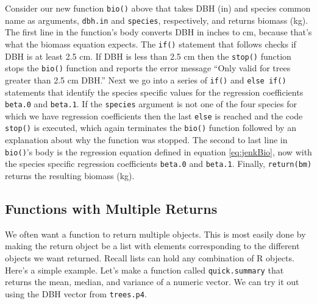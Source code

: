 \documentclass[]{krantz}
\makeatletter
\newenvironment{Shaded}{\begin{snugshade}}{\end{snugshade}}
\newcommand{\KeywordTok}[1]{\textcolor[rgb]{0.27,0.27,0.27}{\textbf{#1}}}
\newcommand{\DataTypeTok}[1]{\textcolor[rgb]{0.27,0.27,0.27}{#1}}
\newcommand{\StringTok}[1]{\textcolor[rgb]{0.5,0.5,0.5}{#1}}
\newcommand{\ControlFlowTok}[1]{\textcolor[rgb]{0.27,0.27,0.27}{\textbf{#1}}}
\newcommand{\OperatorTok}[1]{\textcolor[rgb]{0.43,0.43,0.43}{\textbf{#1}}}
\newcommand{\ErrorTok}[1]{\textcolor[rgb]{0.14,0.14,0.14}{\textbf{#1}}}
\newcommand{\NormalTok}[1]{#1}
\newenvironment{kframe}{%
\medskip{}
\setlength{\fboxsep}{.8em}
 \def\at@end@of@kframe{}%
 \ifinner\ifhmode%
  \def\at@end@of@kframe{\end{minipage}}%
  \begin{minipage}{\columnwidth}%
 \fi\fi%
 \def\FrameCommand##1{\hskip\@totalleftmargin \hskip-\fboxsep
 \colorbox{shadecolor}{##1}\hskip-\fboxsep
     \hskip-\linewidth \hskip-\@totalleftmargin \hskip\columnwidth}%
 \MakeFramed {\advance\hsize-\width
   \@totalleftmargin\z@ \linewidth\hsize
   \@setminipage}}%
 {\par\unskip\endMakeFramed%
 \at@end@of@kframe}
\renewenvironment{Shaded}{\begin{kframe}}{\end{kframe}}
\theoremstyle{definition}
\theoremstyle{definition}
\theoremstyle{definition}
\theoremstyle{remark}
\makeatother
\begin{document}
Consider our new function \texttt{bio()} above that takes DBH (in) and
species common name as arguments, \texttt{dbh.in} and \texttt{species},
respectively, and returns biomass (kg). The first line in the function's
body converts DBH in inches to cm, because that's what the
\citet{jenkins03} biomass equation expects. The \texttt{if()} statement
that follows checks if DBH is at least 2.5 cm. If DBH is less than 2.5
cm then the \texttt{stop()} function stops the \texttt{bio()} function
and reports the error message ``Only valid for trees greater than 2.5 cm
DBH.'' Next we go into a series of \texttt{if()} and \texttt{else\ if()}
statements that identify the species specific values for the regression
coefficients \texttt{beta.0} and \texttt{beta.1}. If the
\texttt{species} argument is not one of the four species for which we
have regression coefficients then the last \texttt{else} is reached and
the code \texttt{stop()} is executed, which again terminates the
\texttt{bio()} function followed by an explanation about why the
function was stopped. The second to last line in \texttt{bio()}'s body
is the regression equation defined in equation \eqref{eq:jenkBio}, now
with the species specific regression coefficients \texttt{beta.0} and
\texttt{beta.1}. Finally, \texttt{return(bm)} returns the resulting
biomass (kg).

\subsection{Functions with Multiple
Returns}\label{functions-with-multiple-returns}

We often want a function to return multiple objects. This is most easily
done by making the return object be a list with elements corresponding
to the different objects we want returned. Recall lists can hold any
combination of R objects. Here's a simple example. Let's make a function
called \texttt{quick.summary} that returns the mean, median, and
variance of a numeric vector. We can try it out using the DBH vector
from \texttt{trees.p4}.

\begin{Shaded}
\end{Shaded}
\end{document}
